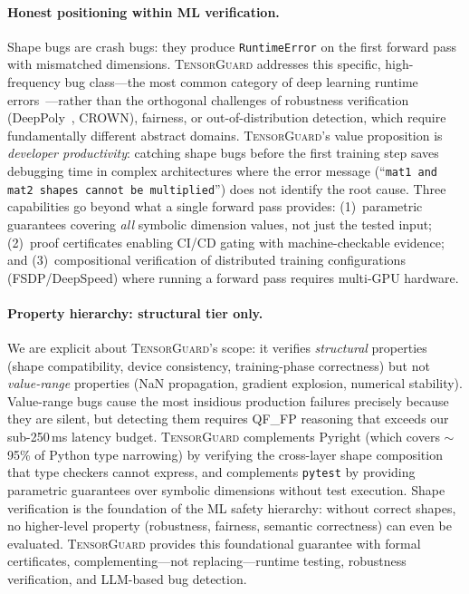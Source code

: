 \documentclass[11pt]{article}
\begin{document}
\paragraph{Honest positioning within ML verification.}
Shape bugs are crash bugs: they produce \texttt{RuntimeError}
on the first forward pass with mismatched dimensions.
\textsc{TensorGuard} addresses this specific, high-frequency
bug class---the most common category of deep learning runtime
errors~\cite{islam19,zhang18}---rather than the orthogonal challenges
of robustness verification
(DeepPoly~\cite{singh19}, CROWN), fairness, or out-of-distribution
detection, which require fundamentally different abstract domains.
\textsc{TensorGuard}'s value proposition is \emph{developer
productivity}: catching shape bugs before the first training step
saves debugging time in complex architectures where the error
message (``\texttt{mat1 and mat2 shapes cannot be multiplied}'')
does not identify the root cause.
Three capabilities go beyond what a single forward pass provides:
(1)~parametric guarantees covering \emph{all} symbolic dimension
values, not just the tested input;
(2)~proof certificates enabling CI/CD gating with machine-checkable
evidence; and
(3)~compositional verification of distributed training configurations
(FSDP/DeepSpeed) where running a forward pass requires multi-GPU
hardware.

\paragraph{Property hierarchy: structural tier only.}
We are explicit about \textsc{TensorGuard}'s scope: it verifies
\emph{structural} properties (shape compatibility, device consistency,
training-phase correctness) but not \emph{value-range} properties
(NaN propagation, gradient explosion, numerical stability).
Value-range bugs cause the most insidious production failures
precisely because they are silent, but detecting them requires
QF\_FP reasoning that exceeds our sub-250\,ms latency budget.
\textsc{TensorGuard} complements Pyright (which covers $\sim$95\%
of Python type narrowing) by verifying the cross-layer shape
composition that type checkers cannot express, and complements
\texttt{pytest} by providing parametric guarantees over symbolic
dimensions without test execution.
Shape verification is the foundation of the ML safety hierarchy:
without correct shapes, no higher-level property (robustness, fairness,
semantic correctness) can even be evaluated.  \textsc{TensorGuard}
provides this foundational guarantee with formal certificates,
complementing---not replacing---runtime testing, robustness verification,
and LLM-based bug detection.
\end{document}
